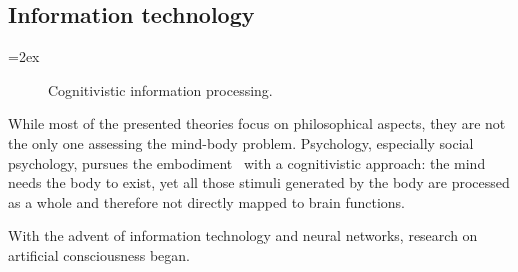 

\subsection{Information technology}

{\columnsep=2ex\begin{wrapfigure}{r}{.45\linewidth}
\vspace*{-\baselineskip}
\caption{Cognitivistic information processing.}
\vspace*{-\baselineskip}
\end{wrapfigure}
While most of the presented theories focus on philosophical aspects, they are not the only one assessing the mind-body problem.
Psychology, especially social psychology, pursues the embodiment~\cite{meier2012embodiment} with a cognitivistic approach:
the mind needs the body to exist, yet all those stimuli generated by the body are processed as a whole and therefore not directly mapped to brain functions.\par}

With the advent of information technology and neural networks, research on artificial consciousness began.

